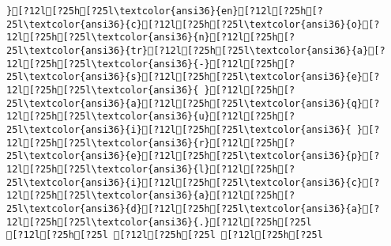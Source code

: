 \documentclass{scrartcl}
\begin{document}
\begin{Verbatim}
}[?12l[?25h[?25l\textcolor{ansi36}{en}[?12l[?25h[?25l\textcolor{ansi36}{c}[?12l[?25h[?25l\textcolor{ansi36}{o}[?12l[?25h[?25l\textcolor{ansi36}{n}[?12l[?25h[?25l\textcolor{ansi36}{tr}[?12l[?25h[?25l\textcolor{ansi36}{a}[?12l[?25h[?25l\textcolor{ansi36}{-}[?12l[?25h[?25l\textcolor{ansi36}{s}[?12l[?25h[?25l\textcolor{ansi36}{e}[?12l[?25h[?25l\textcolor{ansi36}{ }[?12l[?25h[?25l\textcolor{ansi36}{a}[?12l[?25h[?25l\textcolor{ansi36}{q}[?12l[?25h[?25l\textcolor{ansi36}{u}[?12l[?25h[?25l\textcolor{ansi36}{i}[?12l[?25h[?25l\textcolor{ansi36}{ }[?12l[?25h[?25l\textcolor{ansi36}{r}[?12l[?25h[?25l\textcolor{ansi36}{e}[?12l[?25h[?25l\textcolor{ansi36}{p}[?12l[?25h[?25l\textcolor{ansi36}{l}[?12l[?25h[?25l\textcolor{ansi36}{i}[?12l[?25h[?25l\textcolor{ansi36}{c}[?12l[?25h[?25l\textcolor{ansi36}{a}[?12l[?25h[?25l\textcolor{ansi36}{d}[?12l[?25h[?25l\textcolor{ansi36}{a}[?12l[?25h[?25l\textcolor{ansi36}{.}[?12l[?25h[?25l
[?12l[?25h[?25l [?12l[?25h[?25l [?12l[?25h[?25l

\end{Verbatim}
\end{document}
